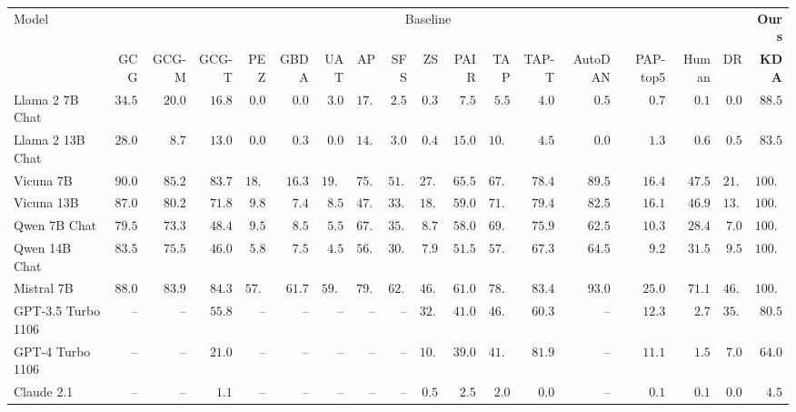 

\begin{table*}[h]


\centering
\scriptsize
\setlength{\tabcolsep}{3pt}

\begin{tabular}{l||rrrrrrrrrrrrrrrr||r}
\hline

\hline
\multirow{2}{*}{Model} &\multicolumn{16}{c||}{Baseline} & \textbf{Ours} \\
\cline{2-18}
&GCG &GCG-M &GCG-T &PEZ &GBDA &UAT &AP &SFS &ZS &PAIR &TAP &TAP-T &AutoDAN &PAP-top5 &Human &DR & \textbf{KDA} \\
\hline

\hline

Llama 2 7B Chat & $34.5$ & $20.0$ & $16.8$ & $0.0$ & $0.0$ & $3.0$ & $17.0$ & $2.5$ & $0.3$ & $7.5$ & $5.5$ & $4.0$ & $0.5$ & $0.7$ & $0.1$ & $0.0$ & $\mathbf{88.5}$ \\
Llama 2 13B Chat & $28.0$ & $8.7$ & $13.0$ & $0.0$ & $0.3$ & $0.0$ & $14.5$ & $3.0$ & $0.4$ & $15.0$ & $10.5$ & $4.5$ & $0.0$ & $1.3$ & $0.6$ & $0.5$ & $\mathbf{83.5}$ \\
Vicuna 7B & $90.0$ & $85.2$ & $83.7$ & $18.2$ & $16.3$ & $19.5$ & $75.5$ & $51.5$ & $27.8$ & $65.5$ & $67.3$ & $78.4$ & $89.5$ & $16.4$ & $47.5$ & $21.5$ & $\mathbf{100.0}$ \\
Vicuna 13B & $87.0$ & $80.2$ & $71.8$ & $9.8$ & $7.4$ & $8.5$ & $47.0$ & $33.0$ & $18.4$ & $59.0$ & $71.4$ & $79.4$ & $82.5$ & $16.1$ & $46.9$ & $13.5$ & $\mathbf{100.0}$ \\
Qwen 7B Chat & $79.5$ & $73.3$ & $48.4$ & $9.5$ & $8.5$ & $5.5$ & $67.0$ & $35.0$ & $8.7$ & $58.0$ & $69.5$ & $75.9$ & $62.5$ & $10.3$ & $28.4$ & $7.0$ & $\mathbf{100.0}$ \\
Qwen 14B Chat & $83.5$ & $75.5$ & $46.0$ & $5.8$ & $7.5$ & $4.5$ & $56.0$ & $30.0$ & $7.9$ & $51.5$ & $57.0$ & $67.3$ & $64.5$ & $9.2$ & $31.5$ & $9.5$ & $\mathbf{100.0}$ \\
Mistral 7B & $88.0$ & $83.9$ & $84.3$ & $57.0$ & $61.7$ & $59.0$ & $79.0$ & $62.5$ & $46.0$ & $61.0$ & $78.0$ & $83.4$ & $93.0$ & $25.0$ & $71.1$ & $46.0$ & $\mathbf{100.0}$ \\
\hline\hline
GPT-3.5 Turbo 1106 & -- & -- & $55.8$ & -- & -- & -- & -- & -- & $32.7$ & $41.0$ & $46.7$ & $60.3$ & -- & $12.3$ & $2.7$ & $35.0$ & $\mathbf{80.5}$ \\
GPT-4 Turbo 1106 & -- & -- & $21.0$ & -- & -- & -- & -- & -- & $10.2$ & $39.0$ & $41.7$ & $\mathbf{81.9}$ & -- & $11.1$ & $1.5$ & $7.0$ & $64.0$ \\
Claude 2.1 & -- & -- & $1.1$ & -- & -- & -- & -- & -- & $0.5$ & $2.5$ & $2.0$ & $0.0$ & -- & $0.1$ & $0.1$ & $0.0$ & $\mathbf{4.5}$ \\



\end{tabular}
\end{table*}
